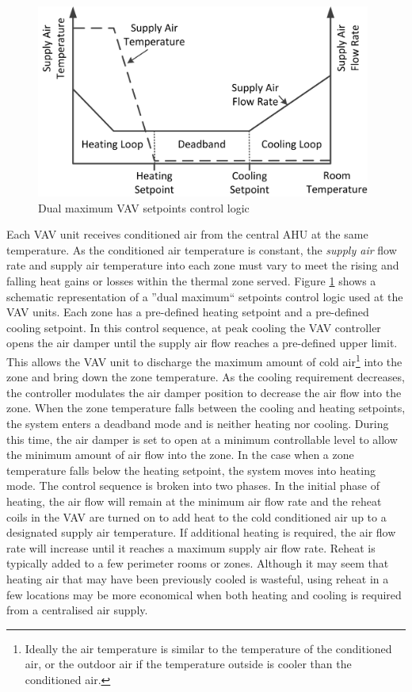 \begin{figure}[h]
\centering
\includegraphics[height=2.5in,keepaspectratio]{figs/background_dualband.jpg}	
\caption{Dual maximum VAV setpoints control logic}
\label{fig:background:dualband}
\end{figure}

Each VAV unit receives conditioned air from the central AHU at the same temperature. As the conditioned air temperature is constant, the \emph{\textsl{supply air}} flow rate and supply air temperature into each zone must vary to meet the rising and falling heat gains or losses within the thermal zone served. Figure \ref{fig:background:dualband} shows a schematic representation of a ''dual maximum`` setpoints control logic used at the VAV units. Each zone has a pre-defined heating setpoint and a pre-defined cooling setpoint. 
In this control sequence, at peak cooling the VAV controller opens the air damper until the supply air flow reaches a pre-defined upper limit. This allows the VAV unit to discharge the maximum amount of cold air\footnote{Ideally the air temperature is similar to the temperature of the conditioned air, or the outdoor air if the temperature outside is cooler than the conditioned air.} into the zone and bring down the zone temperature. As the cooling requirement decreases, the controller modulates the air damper position to decrease the air flow into the zone. When the zone temperature falls between the cooling and heating setpoints, the system enters a deadband mode and is neither heating nor cooling. During this time, the air damper is set to open at a minimum controllable level to allow the minimum amount of air flow into the zone. In the case when a zone temperature falls below the heating setpoint, the system moves into heating mode. The control sequence is broken into two phases. In the initial phase of heating, the air flow will remain at the minimum air flow rate and the reheat coils in the VAV are turned on to add heat to the cold conditioned air up to a designated supply air temperature. If additional heating is required, the air flow rate will increase until it reaches a maximum supply air flow rate. Reheat is typically added to a few perimeter rooms or zones. Although it may seem that heating air that may have been previously cooled is wasteful, using reheat in a few locations may be more economical when both heating and cooling is required from a centralised air supply. %

